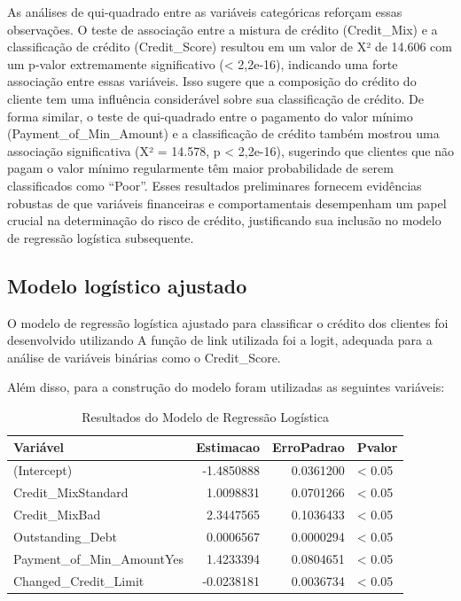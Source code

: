 \documentclass[
  letterpaper,
  DIV=11,
  numbers=noendperiod]{scrreprt}
\begin{document}
As análises de qui-quadrado entre as variáveis categóricas reforçam
essas observações. O teste de associação entre a mistura de crédito
(Credit\_Mix) e a classificação de crédito (Credit\_Score) resultou em
um valor de X² de 14.606 com um p-valor extremamente significativo
(\textless{} 2,2e-16), indicando uma forte associação entre essas
variáveis. Isso sugere que a composição do crédito do cliente tem uma
influência considerável sobre sua classificação de crédito. De forma
similar, o teste de qui-quadrado entre o pagamento do valor mínimo
(Payment\_of\_Min\_Amount) e a classificação de crédito também mostrou
uma associação significativa (X² = 14.578, p \textless{} 2,2e-16),
sugerindo que clientes que não pagam o valor mínimo regularmente têm
maior probabilidade de serem classificados como ``Poor''. Esses
resultados preliminares fornecem evidências robustas de que variáveis
financeiras e comportamentais desempenham um papel crucial na
determinação do risco de crédito, justificando sua inclusão no modelo de
regressão logística subsequente.

\subsection{Modelo logístico
ajustado}\label{modelo-loguxedstico-ajustado}

O modelo de regressão logística ajustado para classificar o crédito dos
clientes foi desenvolvido utilizando A função de link utilizada foi a
logit, adequada para a análise de variáveis binárias como o
Credit\_Score.

Além disso, para a construção do modelo foram utilizadas as seguintes
variáveis:

\begin{longtable}[t]{lrrl}
\caption{\label{tab:unnamed-chunk-35}Resultados do Modelo de Regressão Logística}\\
\toprule
Variável & Estimacao & ErroPadrao & Pvalor\\
\midrule
(Intercept) & -1.4850888 & 0.0361200 & < 0.05\\
Credit\_MixStandard & 1.0098831 & 0.0701266 & < 0.05\\
Credit\_MixBad & 2.3447565 & 0.1036433 & < 0.05\\
Outstanding\_Debt & 0.0006567 & 0.0000294 & < 0.05\\
Payment\_of\_Min\_AmountYes & 1.4233394 & 0.0804651 & < 0.05\\
\addlinespace
Changed\_Credit\_Limit & -0.0238181 & 0.0036734 & < 0.05\\
\bottomrule
\end{longtable}
\end{document}

